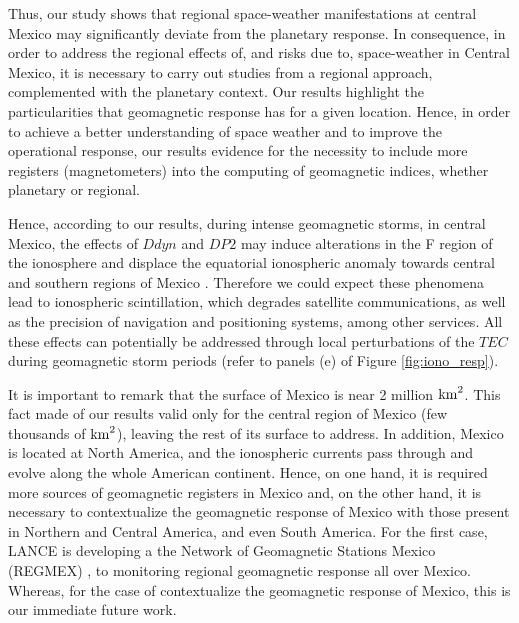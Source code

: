 \documentclass[a4paper,fleqn]{cas-dc}
\begin{document}
Thus, our study shows that regional space-weather manifestations at central Mexico may significantly deviate from the planetary response. In consequence, in order to address the regional effects of, and risks due to, space-weather in Central Mexico, it is necessary to carry out studies from a regional approach, complemented with the planetary context. Our results highlight the particularities that geomagnetic response has for a given location. Hence, in order to achieve a better understanding of space weather and to improve the operational response, our results evidence for the necessity to include more registers (magnetometers) into the computing of geomagnetic indices, whether planetary or regional.

Hence, according to our results, during intense geomagnetic storms, in central Mexico, the effects of $Ddyn$ and $DP2$ may induce alterations in the F region of the ionosphere and displace the equatorial ionospheric anomaly towards central and southern regions of Mexico \citep[as showed by][]{dramaria_13}. Therefore we could expect these phenomena lead to ionospheric scintillation, which degrades satellite communications, as well as the precision of navigation and positioning systems, among other services. All these effects can potentially be addressed through local perturbations of the $TEC$ during geomagnetic storm periods (refer to panels (e) of Figure \ref{fig:iono_resp}).




It is important to remark that the surface of Mexico is near 2 million ${\rm km}^2$. This fact made of our results valid only for the central region of Mexico (few thousands of ${\rm km}^2$), leaving the rest of its surface to address. In addition, Mexico is located at North America, and the ionospheric currents pass through and evolve along the whole American continent. Hence, on one hand, it is required more sources of geomagnetic registers in Mexico and, on the other hand, it is necessary to contextualize the geomagnetic response of Mexico with those present in Northern and Central America, and even South America. For the first case, LANCE is developing a the Network of Geomagnetic Stations Mexico (REGMEX) \citep[see][]{corona2024}, to monitoring regional geomagnetic response all over Mexico. Whereas, for the case of contextualize the geomagnetic response of Mexico, this is our immediate future work.
\end{document}
